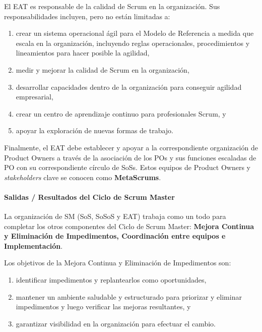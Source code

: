\documentclass{article} %
\begin{document}
\noindent \eject 

\noindent El EAT es responsable de la calidad de Scrum en la organizaci\'{o}n. Sus responsabilidades incluyen, pero no est\'{a}n limitadas a:

\begin{enumerate}
\item  crear un sistema operacional \'{a}gil para el Modelo de Referencia a medida que escala en la organizaci\'{o}n, incluyendo reglas operacionales, procedimientos y lineamientos para hacer posible la agilidad,

\item  medir y mejorar la calidad de Scrum en la organizaci\'{o}n,

\item  desarrollar capacidades dentro de la organizaci\'{o}n para conseguir agilidad empresarial,

\item  crear un centro de aprendizaje continuo para profesionales Scrum, y

\item  apoyar la exploraci\'{o}n de nuevas formas de trabajo.
\end{enumerate}

\noindent 

\noindent Finalmente, el EAT debe establecer y apoyar a la correspondiente organizaci\'{o}n de Product Owners a trav\'{e}s de la asociaci\'{o}n de los POs y sus funciones escaladas de PO con su correspondiente c\'{i}rculo de SoSs. Estos equipos de Product Owners y \textit{stakeholders }clave se conocen como \textbf{MetaScrums}.

\noindent 
\paragraph{Salidas / Resultados del Ciclo de Scrum Master}

\noindent 

\noindent La organizaci\'{o}n de SM (SoS, SoSoS y EAT) trabaja como un todo para completar los otros componentes del Ciclo de Scrum Master: \textbf{Mejora Continua y Eliminaci\'{o}n de Impedimentos, Coordinaci\'{o}n entre equipos e Implementaci\'{o}n}.

\noindent Los objetivos de la Mejora Continua y Eliminaci\'{o}n de Impedimentos son:

\begin{enumerate}
\item  identificar impedimentos y replantearlos como oportunidades,

\item  mantener un ambiente saludable y estructurado para priorizar y eliminar impedimentos y luego verificar las mejoras resultantes, y

\item  garantizar visibilidad en la organizaci\'{o}n para efectuar el cambio.
\end{enumerate}
\end{document}
